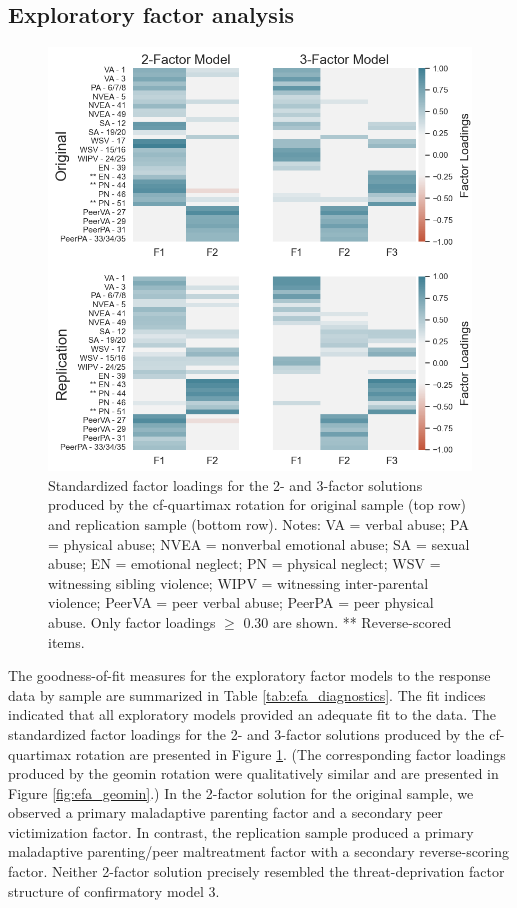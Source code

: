 \documentclass[letterpaper,man,natbib,floatsintext,longtable]{apa6}
\begin{document}
\subsection{Exploratory factor analysis}

\begin{figure}[t!]
    \centering
    \includegraphics[width=1\textwidth,center]{figures/fig04.png}
    \caption{\normalfont Standardized factor loadings for the 2- and 3-factor solutions produced by the cf-quartimax rotation for original sample (top row) and replication sample (bottom row). Notes: VA = verbal abuse; PA = physical abuse; NVEA = nonverbal emotional abuse; SA = sexual abuse; EN = emotional neglect; PN = physical neglect; WSV = witnessing sibling violence; WIPV = witnessing inter-parental violence; PeerVA = peer verbal abuse; PeerPA = peer physical abuse. Only factor loadings $\geq$ 0.30 are shown. ** Reverse-scored items.}
    \label{fig:efa_cf}
\end{figure}

The goodness-of-fit measures for the exploratory factor models to the response data by sample are summarized in Table \ref{tab:efa_diagnostics}. The fit indices indicated that all exploratory models provided an adequate fit to the data. The standardized factor loadings for the 2- and 3-factor solutions produced by the cf-quartimax rotation are presented in Figure \ref{fig:efa_cf}. (The corresponding factor loadings produced by the geomin rotation were qualitatively similar and are presented in Figure \ref{fig:efa_geomin}.) In the 2-factor solution for the original sample, we observed a primary maladaptive parenting factor and a secondary peer victimization factor. In contrast, the replication sample produced a primary maladaptive parenting/peer maltreatment factor with a secondary reverse-scoring factor. Neither 2-factor solution precisely resembled the threat-deprivation factor structure of confirmatory model 3.
\end{document}
